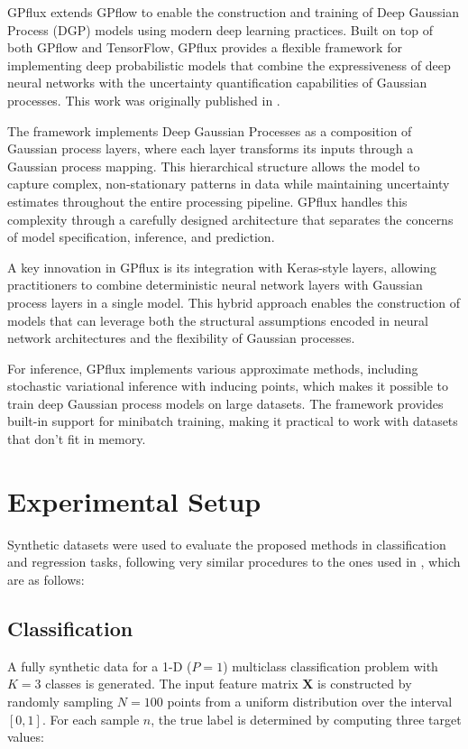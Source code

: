 GPflux extends GPflow to enable the construction and training of Deep
Gaussian Process (DGP) models using modern deep learning practices.
Built on top of both GPflow and TensorFlow, GPflux provides a
flexible framework for implementing deep probabilistic models that
combine the expressiveness of deep neural networks with the
uncertainty quantification capabilities of Gaussian processes. This
work was originally published in \cite{DutordoirEtAl2021}.

The framework implements Deep Gaussian Processes as a composition of
Gaussian process layers, where each layer transforms its inputs
through a Gaussian process mapping. This hierarchical structure
allows the model to capture complex, non-stationary patterns in data
while maintaining uncertainty estimates throughout the entire
processing pipeline. GPflux handles this complexity through a
carefully designed architecture that separates the concerns of model
specification, inference, and prediction.

A key innovation in GPflux is its integration with Keras-style
layers, allowing practitioners to combine deterministic neural
network layers with Gaussian process layers in a single model. This
hybrid approach enables the construction of models that can leverage
both the structural assumptions encoded in neural network
architectures and the flexibility of Gaussian processes.

For inference, GPflux implements various approximate methods,
including stochastic variational inference with inducing points,
which makes it possible to train deep Gaussian process models on
large datasets. The framework provides built-in support for minibatch
training, making it practical to work with datasets that don't fit in
memory.

\section{Experimental Setup}\label{sec:experiments}

Synthetic datasets were used to evaluate the proposed methods in
classification and regression tasks, following very similar
procedures to the ones used in \cite{GilGonzalezEtAl2023}, which
are as follows:

\subsection{Classification}

A fully synthetic data for a 1-D ($P=1$) multiclass classification
problem with $K=3$ classes is generated. The input feature matrix
$\mathbf{X}$ is constructed by randomly sampling $N=100$ points from
a uniform distribution over the interval $[0, 1]$. For each sample
$n$, the true label is determined by computing three target values:


